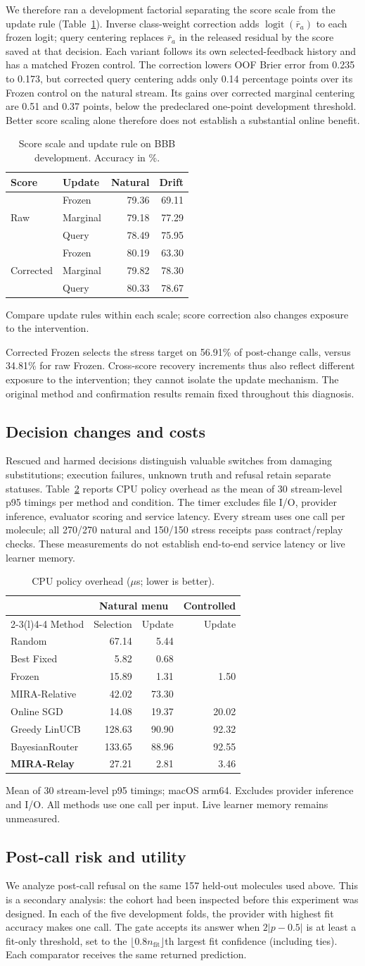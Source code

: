 \documentclass[sigconf,anonymous]{aamas}
\makeatletter
\newcommand{\MiraTableFont}{\fontsize{9}{11}\selectfont}
\newcommand{\tnote}[1]{{\fontsize{8.5}{10}\selectfont\raggedright\par\vspace{3pt}#1\par}}
\newcommand{\notrun}{\textemdash}
\newcommand{\MiraCenterCaption}{Score scale and update rule on BBB development. Accuracy in \%.}
\newcommand{\MiraCenterLabels}{\label{tab:centering-diagnostic}}
\newcommand{\MiraCenterBody}{%
\begingroup\centering\MiraTableFont\setlength{\tabcolsep}{6pt}\renewcommand{\arraystretch}{1.08}
\begin{tabular}{@{}llrr@{}}
\toprule
Score & Update & Natural & Drift \\
\midrule
\multirow{3}{*}{Raw} & Frozen & 79.36 & 69.11 \\
& Marginal & 79.18 & 77.29 \\
& Query & 78.49 & 75.95 \\
\midrule
\multirow{3}{*}{Corrected} & Frozen & 80.19 & 63.30 \\
& Marginal & 79.82 & 78.30 \\
& Query & 80.33 & 78.67 \\
\bottomrule
\end{tabular}\par
\tnote{Compare update rules within each scale; score correction also changes exposure to the intervention.}
\endgroup}
\newcommand{\MiraCostCaption}{CPU policy overhead ($\mu$s; lower is better).}
\newcommand{\MiraCostLabels}{\label{tab:cost-validity}}
\newcommand{\MiraCostBody}{%
\begingroup\centering\MiraTableFont\setlength{\tabcolsep}{4pt}\renewcommand{\arraystretch}{1.08}
\begin{tabular}{@{}lrrr@{}}
\toprule
& \multicolumn{2}{c}{Natural menu} & Controlled \\
\cmidrule(lr){2-3}\cmidrule(l){4-4}
Method & Selection & Update & Update \\
\midrule
Random & 67.14 & 5.44 & \notrun \\
Best Fixed & 5.82 & 0.68 & \notrun \\
Frozen & 15.89 & 1.31 & 1.50 \\
MIRA-Relative & 42.02 & 73.30 & \notrun \\
\midrule
Online SGD & 14.08 & 19.37 & 20.02 \\
Greedy LinUCB & 128.63 & 90.90 & 92.32 \\
BayesianRouter & 133.65 & 88.96 & 92.55 \\
\midrule
\textbf{MIRA-Relay} & 27.21 & 2.81 & 3.46 \\
\bottomrule
\end{tabular}\par
\tnote{Mean of 30 stream-level p95 timings; macOS arm64. Excludes provider inference and I/O. All methods use one call per input. Live learner memory remains unmeasured.}
\endgroup}
\makeatother
\begin{document}
We therefore ran a development factorial separating the score scale from the update rule (Table~\ref{tab:centering-diagnostic}). Inverse class-weight correction adds $\operatorname{logit}(\bar r_a)$ to each frozen logit; query centering replaces $\bar r_a$ in the released residual by the score saved at that decision. Each variant follows its own selected-feedback history and has a matched Frozen control. The correction lowers OOF Brier error from 0.235 to 0.173, but corrected query centering adds only 0.14 percentage points over its Frozen control on the natural stream. Its gains over corrected marginal centering are 0.51 and 0.37 points, below the predeclared one-point development threshold. Better score scaling alone therefore does not establish a substantial online benefit.

\begin{table}[t]
\caption{\MiraCenterCaption}
\MiraCenterLabels
\MiraCenterBody
\end{table}

Corrected Frozen selects the stress target on 56.91\% of post-change calls, versus 34.81\% for raw Frozen. Cross-score recovery increments thus also reflect different exposure to the intervention; they cannot isolate the update mechanism. The original method and confirmation results remain fixed throughout this diagnosis.


\subsection{Decision changes and costs}
Rescued and harmed decisions distinguish valuable switches from damaging substitutions; execution failures, unknown truth and refusal retain separate statuses. Table~\ref{tab:cost-validity} reports CPU policy overhead as the mean of 30 stream-level p95 timings per method and condition. The timer excludes file I/O, provider inference, evaluator scoring and service latency. Every stream uses one call per molecule; all 270/270 natural and 150/150 stress receipts pass contract/replay checks. These measurements do not establish end-to-end service latency or live learner memory.

\begin{table}[t]
\caption{\MiraCostCaption}
\MiraCostLabels
\MiraCostBody
\end{table}

\subsection{Post-call risk and utility}
We analyze post-call refusal on the same 157 held-out molecules used above. This is a secondary analysis: the cohort had been inspected before this experiment was designed. In each of the five development folds, the provider with highest fit accuracy makes one call. The gate accepts its answer when $2|p-0.5|$ is at least a fit-only threshold, set to the $\lfloor0.8n_{\mathrm{fit}}\rfloor$th largest fit confidence (including ties). Each comparator receives the same returned prediction.
\end{document}
